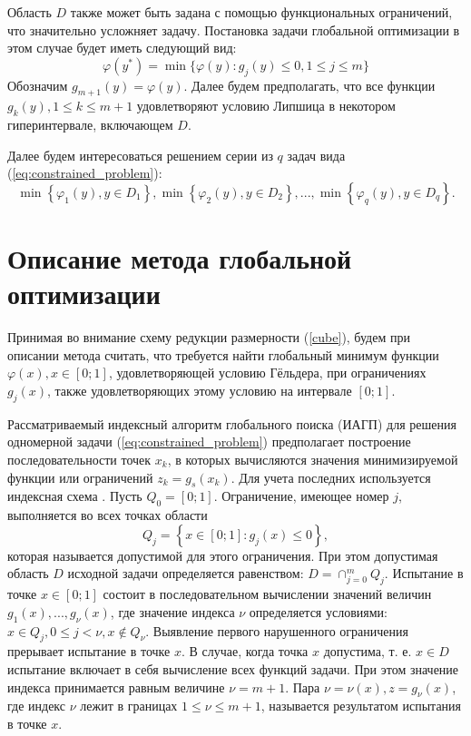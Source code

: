 \documentclass[11pt, oneside, a4paper]{article}
\begin{document}
Область \(D\) также может быть задана с помощью функциональных ограничений, что
значительно усложняет задачу.
Постановка задачи глобальной оптимизации в этом случае будет иметь следующий вид:
\begin{equation}
  \label{eq:constrained_problem}
  \varphi(y^*)=\min\{\varphi(y):g_j(y)\leqslant 0, 1\leqslant j\leqslant m\}
\end{equation}
Обозначим \(g_{m+1}(y)=\varphi(y)\). Далее будем предполагать, что все функции \(g_k(y),1\leqslant k \leqslant m+1\)
удовлетворяют условию Липшица в некотором гиперинтервале, включающем \(D\).

Далее будем интересоваться решением серии из \(q\) задач вида (\ref{eq:constrained_problem}):
\begin{equation}
  \label{eq:many_problems}
  \min\left\{\varphi_1(y), y\in D_1 \right\}, \min\left\{\varphi_2(y), y\in D_2\right\},..., \min\left\{\varphi_q(y), y\in D_q\right\}.
\end{equation}

\section{Описание метода глобальной оптимизации}

Принимая во внимание схему редукции размерности (\ref{cube}), будем при описании метода считать, что
требуется найти глобальный минимум функции \(\varphi(x), x\in[0;1]\),
удовлетворяющей условию Гёльдера, при ограничениях \(g_j(x)\), также
удовлетворяющих этому условию на интервале \([0;1]\).

Рассматриваемый индексный алгоритм глобального поиска (ИАГП) для решения
одномерной задачи (\ref{eq:constrained_problem}) предполагает построение последовательности
точек \(x_k\), в которых вычисляются значения минимизируемой функции или ограничений \(z_k = g_s(x_k)\).
Для учета последних используется индексная схема \cite{Strongin2000}. Пусть \(Q_0=[0;1]\). Ограничение, имеющее номер
 \(j\), выполняется во всех точках области
\begin{displaymath}
  Q_j=\left\{x\in [0;1]:g_j(x)\leq 0\right\},
\end{displaymath}
которая называется допустимой для этого ограничения. При этом допустимая область \(D\)
исходной задачи определяется равенством: \(D=\cap _{j=0}^{m}Q_{j}\).
Испытание в точке \(x\in [0;1]\) состоит в последовательном вычислении значений
величин \(g_{1}(x),...,g_{\nu }(x)\), где значение индекса \(\nu\) определяется условиями:
\(x\in Q_{j},0\leqslant j<\nu ,x\notin Q_{\nu }\). Выявление первого нарушенного ограничения
прерывает испытание в точке \(x\). В случае, когда точка \(x\)  допустима, т. е.
\(x\in D\) испытание включает в себя вычисление всех функций задачи. При этом значение
индекса принимается равным величине \(\nu =m+1\). Пара \(\nu =\nu (x),z=g_{\nu }(x)\),
где индекс \(\nu\) лежит в границах \(1\leqslant \nu \leqslant m+1\), называется результатом
испытания в точке \(x\).
\end{document}
